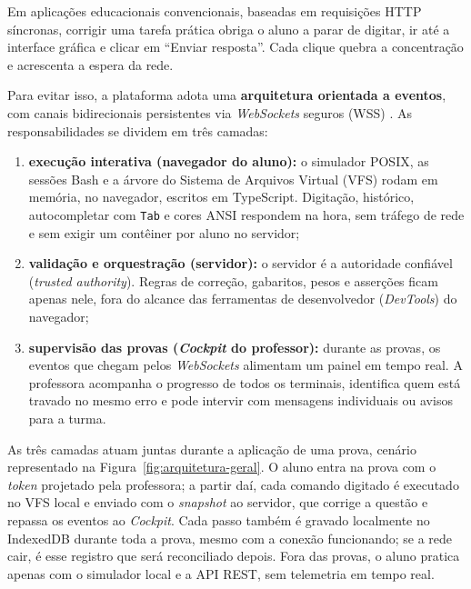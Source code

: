 Em aplicações educacionais convencionais, baseadas em requisições HTTP síncronas, corrigir uma tarefa prática obriga o aluno a parar de digitar, ir até a interface gráfica e clicar em ``Enviar resposta''. Cada clique quebra a concentração e acrescenta a espera da rede.

Para evitar isso, a plataforma adota uma \textbf{arquitetura orientada a eventos}, com canais bidirecionais persistentes via \textit{WebSockets} seguros (WSS) \cite{fette2011websocket}. As responsabilidades se dividem em três camadas:

\begin{enumerate}
    \item \textbf{execução interativa (navegador do aluno):} o simulador POSIX, as sessões Bash e a árvore do Sistema de Arquivos Virtual (VFS) rodam em memória, no navegador, escritos em TypeScript. Digitação, histórico, autocompletar com \texttt{Tab} e cores ANSI respondem na hora, sem tráfego de rede e sem exigir um contêiner por aluno no servidor;
    \item \textbf{validação e orquestração (servidor):} o servidor é a autoridade confiável (\textit{trusted authority}). Regras de correção, gabaritos, pesos e asserções ficam apenas nele, fora do alcance das ferramentas de desenvolvedor (\textit{DevTools}) do navegador;
    \item \textbf{supervisão das provas (\textit{Cockpit} do professor):} durante as provas, os eventos que chegam pelos \textit{WebSockets} alimentam um painel em tempo real. A professora acompanha o progresso de todos os terminais, identifica quem está travado no mesmo erro e pode intervir com mensagens individuais ou avisos para a turma.
\end{enumerate}

As três camadas atuam juntas durante a aplicação de uma prova, cenário representado na Figura~\ref{fig:arquitetura-geral}. O aluno entra na prova com o \textit{token} projetado pela professora; a partir daí, cada comando digitado é executado no VFS local e enviado com o \textit{snapshot} ao servidor, que corrige a questão e repassa os eventos ao \textit{Cockpit}. Cada passo também é gravado localmente no IndexedDB durante toda a prova, mesmo com a conexão funcionando; se a rede cair, é esse registro que será reconciliado depois. Fora das provas, o aluno pratica apenas com o simulador local e a API REST, sem telemetria em tempo real.

